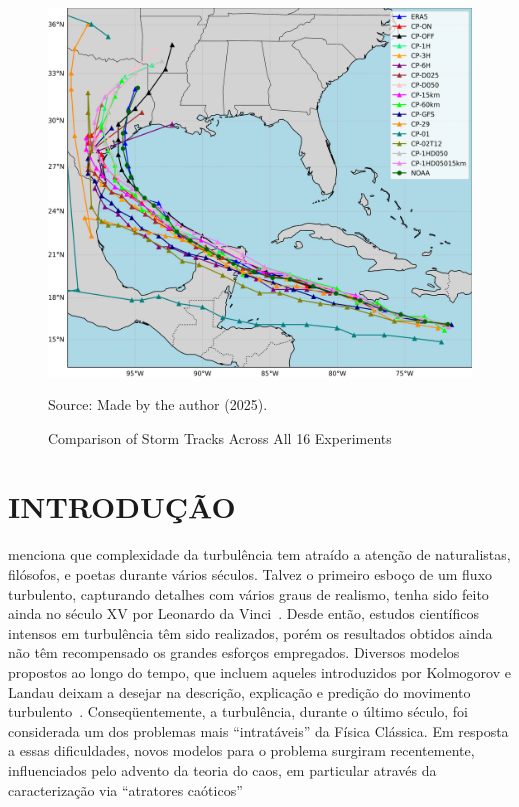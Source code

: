 
\begin{figure}[!ht]
    \centering
    \caption{Comparison of Storm Tracks Across All 16 Experiments} %
    \includegraphics[width=\textwidth]{docs/figuras/findings/ALL_tracks.png} %
    \vspace{0.5em}
    
    Source: Made by the author (2025). %
    \label{fig:all_tracks_before} %
\end{figure}


\chapter{INTRODUÇÃO}

 menciona que complexidade da turbulência tem atraído \cite{Chelimsky2010, Chelimsky2010XX} a atenção de naturalistas, filósofos, e poetas durante vários séculos. Talvez o primeiro esboço de um fluxo turbulento, capturando detalhes com vários graus de realismo, tenha sido feito ainda no século XV por Leonardo da Vinci~\cite{sreenivasan/99}. Desde então, estudos científicos intensos em turbulência têm sido realizados, porém os resultados obtidos ainda não têm recompensado os grandes esforços empregados. Diversos modelos propostos ao longo do tempo, que incluem aqueles introduzidos por Kolmogorov e Landau deixam a desejar na descrição, explicação e predição do movimento turbulento~\cite{ruelle/91}. Conseqüentemente, a turbulência, durante o último século, foi considerada um dos problemas mais ``intratáveis'' da Física Clássica. Em resposta a essas dificuldades, novos modelos para o problema surgiram recentemente, influenciados pelo advento da teoria do caos, em particular através da caracterização via ``atratores caóticos''~\cite{ruelltak/71} 

